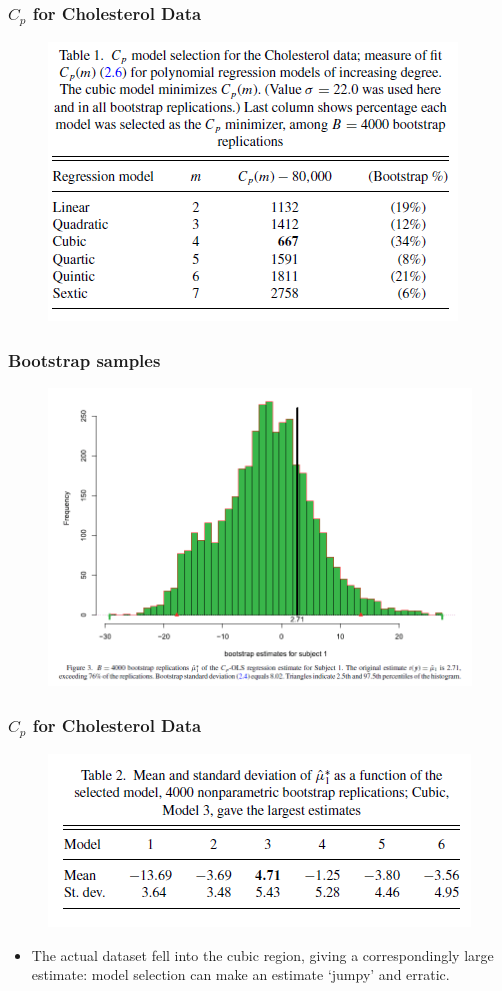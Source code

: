 \documentclass{beamer}
\begin{document}
\begin{frame}
\frametitle{$C_p$ for Cholesterol Data}
\begin{figure}[h]
\centering
\includegraphics[width=240bp, height= 160bp]{table1_e.png}
\end{figure}
\end{frame}
\begin{frame}
\frametitle{Bootstrap samples}
\begin{figure}[h]
\centering
\includegraphics[width=280bp, height= 200bp]{figure3_e.png}
\end{figure}
\end{frame}
\begin{frame}
\frametitle{$C_p$ for Cholesterol Data}
\begin{figure}[h]
\centering
\includegraphics[width=240bp, height= 100bp]{table2_e.png}
\end{figure}
\begin{itemize}
\item The actual dataset fell into the cubic region, giving a correspondingly large estimate: model selection can make an estimate `jumpy' and erratic.
\end{itemize}
\end{frame}
\end{document}
